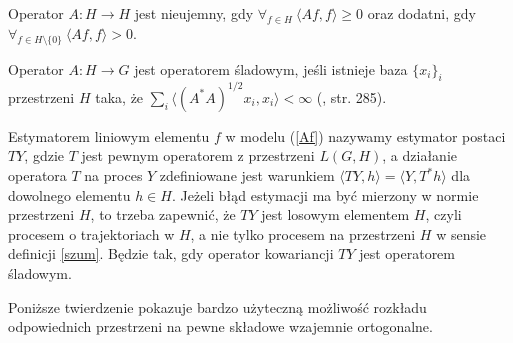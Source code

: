 \documentclass[man,mfiu]{mgrwms}
\begin{document}
Operator $A\colon H\to H$ jest nieujemny, gdy $\forall_{f\in H}\ \langle Af,f\rangle\geq 0$ oraz dodatni, gdy $\forall_{f\in H\setminus \{0\}}\ \langle Af,f\rangle> 0$.

Operator $A\colon H\to G$ jest operatorem śladowym, jeśli istnieje baza $\{x_i\}_i$ przestrzeni $H$ taka, że $\sum_i\langle (A^*A)^{1/2}x_i,x_i\rangle <\infty$ (\cite{hindus}, str. 285).

Estymatorem liniowym elementu $f$ w modelu (\ref{Af}) nazywamy estymator postaci $TY$, gdzie $T$ jest pewnym operatorem z przestrzeni $L(G,H)$, a działanie operatora $T$ na proces $Y$ zdefiniowane jest warunkiem $\langle TY,h\rangle =\langle Y,T^*h\rangle$ dla dowolnego elementu $h\in H$. Jeżeli błąd estymacji ma być mierzony w normie przestrzeni $H$, to trzeba zapewnić, że $TY$ jest losowym elementem $H$, czyli procesem o trajektoriach w $H$, a nie tylko procesem na przestrzeni $H$ w sensie definicji \ref{szum}. Będzie tak, gdy operator kowariancji $TY$ jest operatorem śladowym.


Poniższe twierdzenie pokazuje bardzo użyteczną możliwość rozkładu odpowiednich przestrzeni na pewne składowe wzajemnie ortogonalne.
\end{document}

